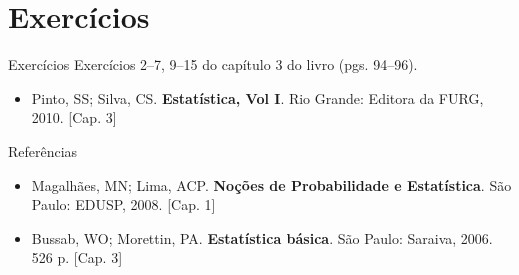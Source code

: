 \documentclass[10pt]{beamer}\usepackage[]{graphicx}\usepackage[]{color}
\theoremstyle{definition}
\begin{document}
\section{Exercícios}

\begin{frame}[fragile]{Exercícios}
  Exercícios 2--7, 9--15 do capítulo 3 do livro (pgs. 94--96).
  \vspace{1em}
  \begin{itemize}
  \item[] Pinto, SS; Silva, CS. \textbf{Estatística, Vol I}. Rio Grande:
    Editora da FURG, 2010. [Cap. 3]
  \end{itemize}
\end{frame}

\begin{frame}{Referências}
  \begin{itemize}
  \item Magalhães, MN; Lima, ACP. \textbf{Noções de Probabilidade e
    Estatística}. São Paulo: EDUSP, 2008. [Cap. 1]
  \item Bussab, WO; Morettin, PA. \textbf{Estatística básica}. São
    Paulo: Saraiva, 2006. 526 p. [Cap. 3]
  \end{itemize}
\end{frame}
\end{document}
